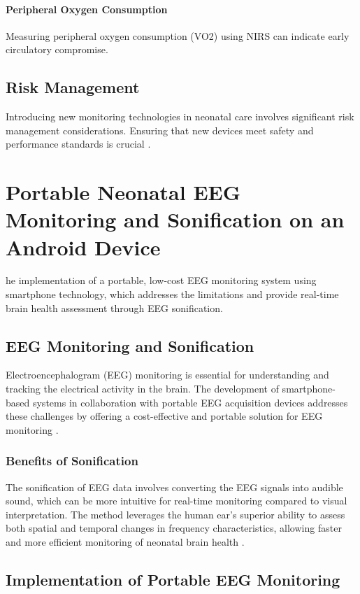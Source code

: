 \documentclass[12pt,journal,compsoc]{IEEEtran}
\begin{document}
\paragraph{Peripheral Oxygen Consumption}
Measuring peripheral oxygen consumption (VO2) using NIRS can indicate early circulatory compromise. 

\subsection{Risk Management}
Introducing new monitoring technologies in neonatal care involves significant risk management considerations. Ensuring that new devices meet safety and performance standards is crucial \cite{IEEEhowto:nicklin}.

\section{Portable Neonatal EEG Monitoring and Sonification on an Android Device}
he implementation of a portable, low-cost EEG monitoring system using smartphone technology, which addresses the limitations and provide real-time brain health assessment through EEG sonification.

\subsection{EEG Monitoring and Sonification}
Electroencephalogram (EEG) monitoring is essential for understanding and tracking the electrical activity in the brain. The development of smartphone-based systems in collaboration with portable EEG acquisition devices addresses these challenges by offering a cost-effective and portable solution for EEG monitoring \cite{IEEEhowto:poveda}.

\subsubsection{Benefits of Sonification}
The sonification of EEG data involves converting the EEG signals into audible sound, which can be more intuitive for real-time monitoring compared to visual interpretation. The method leverages the human ear's superior ability to assess both spatial and temporal changes in frequency characteristics, allowing faster and more efficient monitoring of neonatal brain health \cite{IEEEhowto:poveda}.

\subsection{Implementation of Portable EEG Monitoring}
\end{document}
